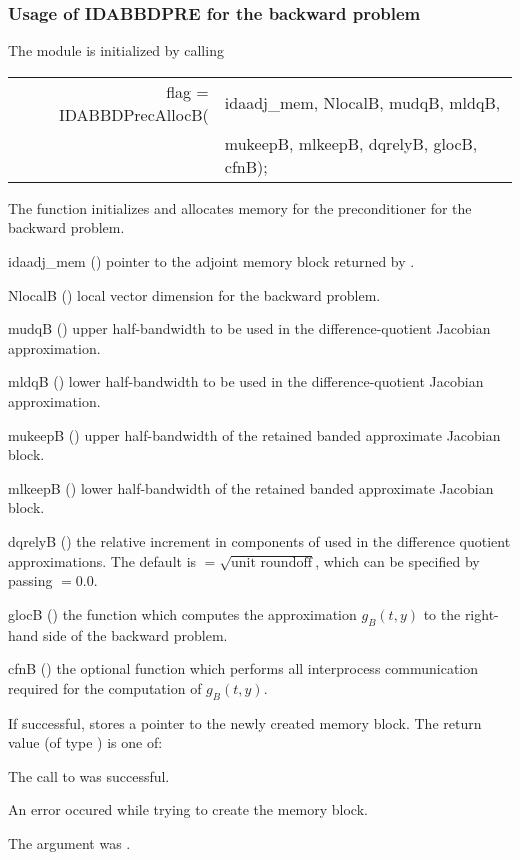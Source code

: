 \subsubsection{Usage of IDABBDPRE for the backward problem}
The {\idabbdpre} module is initialized by calling
{
  \begin{tabular}[t]{@{}r@{}l@{}}
    flag = IDABBDPrecAllocB(&idaadj\_mem, NlocalB, mudqB, mldqB, \\
                           &mukeepB, mlkeepB, dqrelyB, glocB, cfnB);
  \end{tabular}
}
{
  The function  initializes and allocates
  memory for the {\idabbdpre} preconditioner for the backward problem.
}
{
  \begin{args}
  \item[idaadj\_mem] ()
    pointer to the adjoint memory block returned by .
  \item[NlocalB] ()
    local vector dimension for the backward problem.
  \item[mudqB] ()
    upper half-bandwidth to be used in the difference-quotient Jacobian approximation.
  \item[mldqB] ()
    lower half-bandwidth to be used in the difference-quotient Jacobian approximation.
  \item[mukeepB] ()
    upper half-bandwidth of the retained banded approximate Jacobian block.
  \item[mlkeepB] ()
    lower half-bandwidth of the retained banded approximate Jacobian block.
  \item[dqrelyB] ()
    the relative increment in components of  used in the difference quotient
    approximations.  The default is $ = \sqrt{\text{unit roundoff}}$, which
    can be specified by passing $ = 0.0$.
  \item[glocB] ()
    the {\C} function which computes the approximation $g_B(t,y)$ to the right-hand
    side of the backward problem. 
  \item[cfnB] ()
    the optional {\C} function which performs all interprocess communication required for
    the computation of $g_B(t,y)$.
  \end{args}
}
{
  If successful,  stores a pointer to the newly created 
  {\idabbdpre} memory block.
  The return value  (of type ) is one of:
  \begin{args}
  \item[\Id{IDABBDPRE\_SUCCESS}]
    The call to  was successful.
  \item[\Id{IDABBDPRE\_PDATA\_NULL}]
    An error occured while trying to create the {\idabbdpre} memory block.
  \item[\Id{IDABBDPRE\_ADJMEM\_NULL}]
    The  argument was .
  \end{args}
}
